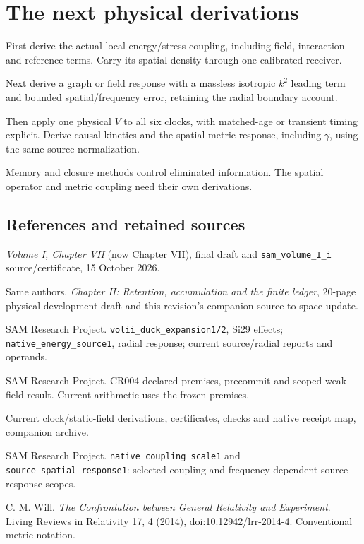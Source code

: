 \documentclass[10pt,twocolumn,letterpaper]{article}
\begin{document}
\section{The next physical derivations}
First derive the actual local energy/stress coupling, including field, interaction and reference terms. Carry its spatial density through one calibrated receiver.

Next derive a graph or field response with a massless isotropic $k^2$ leading term and bounded spatial/frequency error, retaining the radial boundary account.

Then apply one physical $V$ to all six clocks, with matched-age or transient timing explicit. Derive causal kinetics and the spatial metric response, including $\gamma$, using the same source normalization.

Memory and closure methods control eliminated information. The spatial operator and metric coupling need their own derivations.

\subsection*{References and retained sources}
{\footnotesize\raggedright
\noindent[1] \emph{Volume I, Chapter VII} (now Chapter VII), final draft and \nolinkurl{sam_volume_I_i} source/certificate, 15 October 2026.

\noindent[2] Same authors. \emph{Chapter II: Retention, accumulation and the finite ledger}, 20-page physical development draft and this revision's companion source-to-space update.

\noindent[3] SAM Research Project. \nolinkurl{volii_duck_expansion1/2}, Si29 effects; \nolinkurl{native_energy_source1}, radial response; current source/radial reports and operands.

\noindent[4] SAM Research Project. CR004 declared premises, precommit and scoped weak-field result. Current arithmetic uses the frozen premises.

\noindent[5] Current clock/static-field derivations, certificates, checks and native receipt map, companion archive.

\noindent[6] SAM Research Project. \nolinkurl{native_coupling_scale1} and \nolinkurl{source_spatial_response1}: selected coupling and frequency-dependent source-response scopes.

\begin{samepage}
\noindent[7] C. M. Will. \emph{The Confrontation between General Relativity and Experiment}. Living Reviews in Relativity 17, 4 (2014), doi:10.12942/lrr-2014-4. Conventional metric notation.
\par\end{samepage}

\par}
\end{document}
